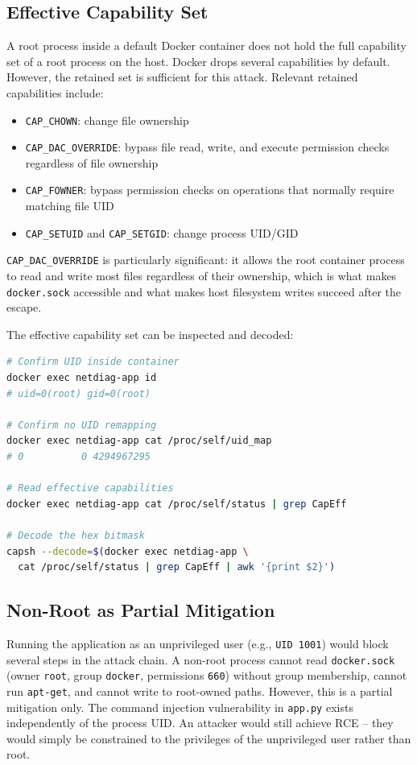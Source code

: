 \subsection*{Effective Capability Set}

A root process inside a default Docker container does not hold the full capability set of a root process on the host. Docker drops several capabilities by default. However, the retained set is sufficient for this attack. Relevant retained capabilities include:

\begin{itemize}
    \item \texttt{CAP\_CHOWN}: change file ownership
    \item \texttt{CAP\_DAC\_OVERRIDE}: bypass file read, write, and execute permission checks regardless of file ownership
    \item \texttt{CAP\_FOWNER}: bypass permission checks on operations that normally require matching file UID
    \item \texttt{CAP\_SETUID} and \texttt{CAP\_SETGID}: change process UID/GID
\end{itemize}

\texttt{CAP\_DAC\_OVERRIDE} is particularly significant: it allows the root container process to read and write most files regardless of their ownership, which is what makes \texttt{docker.sock} accessible and what makes host filesystem writes succeed after the escape.

The effective capability set can be inspected and decoded:

\begin{lstlisting}[language=bash]
# Confirm UID inside container
docker exec netdiag-app id
# uid=0(root) gid=0(root)

# Confirm no UID remapping
docker exec netdiag-app cat /proc/self/uid_map
# 0          0 4294967295

# Read effective capabilities
docker exec netdiag-app cat /proc/self/status | grep CapEff

# Decode the hex bitmask
capsh --decode=$(docker exec netdiag-app \
  cat /proc/self/status | grep CapEff | awk '{print $2}')
\end{lstlisting}

\subsection*{Non-Root as Partial Mitigation}

Running the application as an unprivileged user (e.g., \texttt{UID 1001}) would block several steps in the attack chain. A non-root process cannot read \texttt{docker.sock} (owner \texttt{root}, group \texttt{docker}, permissions \texttt{660}) without group membership, cannot run \texttt{apt-get}, and cannot write to root-owned paths. However, this is a partial mitigation only. The command injection vulnerability in \texttt{app.py} exists independently of the process UID. An attacker would still achieve RCE -- they would simply be constrained to the privileges of the unprivileged user rather than root.

